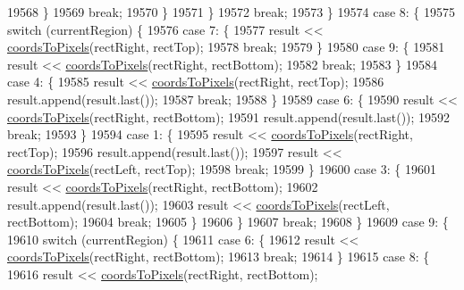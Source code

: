 \begin{DoxyCode}
19568       \}
19569       \textcolor{keywordflow}{break};
19570     \}
19571     \}
19572     \textcolor{keywordflow}{break};
19573   \}
19574   \textcolor{keywordflow}{case} 8: \{
19575     \textcolor{keywordflow}{switch} (currentRegion) \{
19576     \textcolor{keywordflow}{case} 7: \{
19577       result << \hyperlink{class_q_c_p_abstract_plottable_ade710a776104b14c1c835168ce1bfc5c}{coordsToPixels}(rectRight, rectTop);
19578       \textcolor{keywordflow}{break};
19579     \}
19580     \textcolor{keywordflow}{case} 9: \{
19581       result << \hyperlink{class_q_c_p_abstract_plottable_ade710a776104b14c1c835168ce1bfc5c}{coordsToPixels}(rectRight, rectBottom);
19582       \textcolor{keywordflow}{break};
19583     \}
19584     \textcolor{keywordflow}{case} 4: \{
19585       result << \hyperlink{class_q_c_p_abstract_plottable_ade710a776104b14c1c835168ce1bfc5c}{coordsToPixels}(rectRight, rectTop);
19586       result.append(result.last());
19587       \textcolor{keywordflow}{break};
19588     \}
19589     \textcolor{keywordflow}{case} 6: \{
19590       result << \hyperlink{class_q_c_p_abstract_plottable_ade710a776104b14c1c835168ce1bfc5c}{coordsToPixels}(rectRight, rectBottom);
19591       result.append(result.last());
19592       \textcolor{keywordflow}{break};
19593     \}
19594     \textcolor{keywordflow}{case} 1: \{
19595       result << \hyperlink{class_q_c_p_abstract_plottable_ade710a776104b14c1c835168ce1bfc5c}{coordsToPixels}(rectRight, rectTop);
19596       result.append(result.last());
19597       result << \hyperlink{class_q_c_p_abstract_plottable_ade710a776104b14c1c835168ce1bfc5c}{coordsToPixels}(rectLeft, rectTop);
19598       \textcolor{keywordflow}{break};
19599     \}
19600     \textcolor{keywordflow}{case} 3: \{
19601       result << \hyperlink{class_q_c_p_abstract_plottable_ade710a776104b14c1c835168ce1bfc5c}{coordsToPixels}(rectRight, rectBottom);
19602       result.append(result.last());
19603       result << \hyperlink{class_q_c_p_abstract_plottable_ade710a776104b14c1c835168ce1bfc5c}{coordsToPixels}(rectLeft, rectBottom);
19604       \textcolor{keywordflow}{break};
19605     \}
19606     \}
19607     \textcolor{keywordflow}{break};
19608   \}
19609   \textcolor{keywordflow}{case} 9: \{
19610     \textcolor{keywordflow}{switch} (currentRegion) \{
19611     \textcolor{keywordflow}{case} 6: \{
19612       result << \hyperlink{class_q_c_p_abstract_plottable_ade710a776104b14c1c835168ce1bfc5c}{coordsToPixels}(rectRight, rectBottom);
19613       \textcolor{keywordflow}{break};
19614     \}
19615     \textcolor{keywordflow}{case} 8: \{
19616       result << \hyperlink{class_q_c_p_abstract_plottable_ade710a776104b14c1c835168ce1bfc5c}{coordsToPixels}(rectRight, rectBottom);

\end{DoxyCode}
